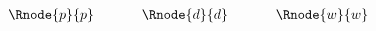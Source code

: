 $
\begin{array}{cp{0.5cm}cp{0.5cm}c}
\Rnode{p}{p}   &  &   \Rnode{d}{d}  & &    \Rnode{w}{w}                
\end{array}
$
\idcomp 
{}
